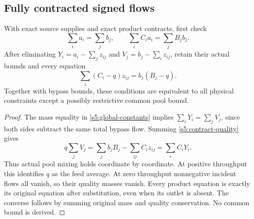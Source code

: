 \subsection{Fully contracted signed flows}\label{s5:scaled}

\begin{lemma}\label{s5:conservation}
With exact source supplies and exact product contracts, first check
\begin{equation}
 \sum_i a_i=\sum_j b_j,\qquad
 \sum_i C_i a_i=\sum_j B_jb_j.
 \label{s5:global-constants}
\end{equation}
After eliminating $Y_i=a_i-\sum_jz_{ij}$ and
$V_j=b_j-\sum_i z_{ij}$, retain their actual bounds and every equation
\begin{equation}
 \sum_i(C_i-q)z_{ij}=b_j(B_j-q).
 \label{s5:contract-quality}
\end{equation}
Together with bypass bounds, these conditions are equivalent to all
physical constraints except a possibly restrictive common pool bound.
\end{lemma}
\begin{proof}
The mass equality in \eqref{s5:global-constants} implies
$\sum_iY_i=\sum_jV_j$, since both sides subtract the same total bypass
flow. Summing \eqref{s5:contract-quality} gives
\[
 q\sum_jV_j=\sum_j b_jB_j-\sum_{ij}C_i z_{ij}
                         =\sum_i C_iY_i.
\]
Thus actual pool mixing holds coordinate by coordinate. At positive
throughput this identifies $q$ as the feed average. At zero throughput
nonnegative incident flows all vanish, so their quality masses vanish.
Every product equation is exactly its original equation after substitution,
even when its outlet is absent. The converse follows by summing original
mass and quality conservation. No common bound is derived.
\end{proof}

